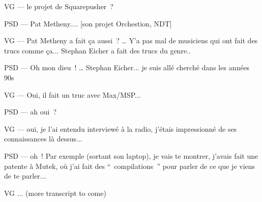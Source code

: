 VG —  le projet de Squarepusher ? 

PSD — Pat Metheny.... [son projet Orchestion, NDT] 

VG —  Pat Metheny a fait ça aussi ? … Y'a pas mal de musiciens qui ont fait des trucs comme ça... Stephan Eicher a fait des trucs du genre.. 

PSD — Oh mon dieu ! … Stephan Eicher... je suis allé cherché dans les années 90s 

VG —  Oui, il fait un truc avec Max/MSP... 

PSD — ah oui ? 

VG —  oui, je l'ai entendu interviewé à la radio, j'étais impressionné de ses connaissances là dessus... 

PSD — oh ! Par exemple (sortant son laptop), je vais te montrer, j'avais fait une patente à Mutek, où j'ai fait des “ compilations ” pour parler de ce que je viens de te parler... 

VG ...
(more transcript to come)